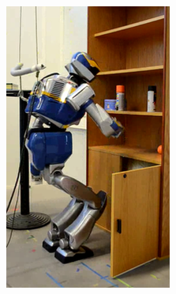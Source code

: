 \begin{figure}
\begin{subfigure}{0.19\columnwidth}
    \includegraphics[width = \columnwidth]
                    {src/chap3-optimal-motion-planning/figure/shelves-8.png}
    \label{shelves-8}
  \end{subfigure}
  \begin{subfigure}{0.19\columnwidth}
    \centering

\end{subfigure}
\end{figure}
